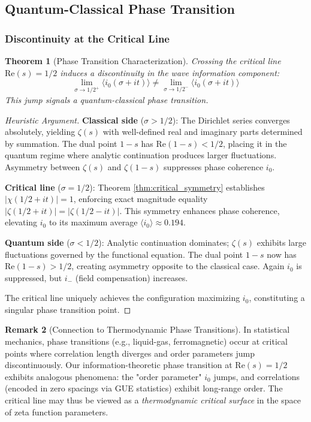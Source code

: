 \documentclass[12pt]{article}
\theoremstyle{plain}
\newtheorem{theorem}{Theorem}[section]
\theoremstyle{definition}
\newtheorem{remark}[theorem]{Remark}
\begin{document}
\subsection{Quantum-Classical Phase Transition}

\subsubsection{Discontinuity at the Critical Line}

\begin{theorem}[Phase Transition Characterization]\label{thm:phase_transition}
Crossing the critical line $\text{Re}(s) = 1/2$ induces a discontinuity in the wave information component:
\begin{equation}
\lim_{\sigma \to 1/2^+} \langle i_0(\sigma + it) \rangle \neq \lim_{\sigma \to 1/2^-} \langle i_0(\sigma + it) \rangle
\end{equation}
This jump signals a quantum-classical phase transition.
\end{theorem}

\begin{proof}[Heuristic Argument]
\textbf{Classical side} ($\sigma > 1/2$): The Dirichlet series converges absolutely, yielding $\zeta(s)$ with well-defined real and imaginary parts determined by summation. The dual point $1-s$ has $\text{Re}(1-s) < 1/2$, placing it in the quantum regime where analytic continuation produces larger fluctuations. Asymmetry between $\zeta(s)$ and $\zeta(1-s)$ suppresses phase coherence $i_0$.

\textbf{Critical line} ($\sigma = 1/2$): Theorem \ref{thm:critical_symmetry} establishes $|\chi(1/2+it)| = 1$, enforcing exact magnitude equality $|\zeta(1/2+it)| = |\zeta(1/2-it)|$. This symmetry enhances phase coherence, elevating $i_0$ to its maximum average $\langle i_0 \rangle \approx 0.194$.

\textbf{Quantum side} ($\sigma < 1/2$): Analytic continuation dominates; $\zeta(s)$ exhibits large fluctuations governed by the functional equation. The dual point $1-s$ now has $\text{Re}(1-s) > 1/2$, creating asymmetry opposite to the classical case. Again $i_0$ is suppressed, but $i_-$ (field compensation) increases.

The critical line uniquely achieves the configuration maximizing $i_0$, constituting a singular phase transition point.
\end{proof}

\begin{remark}[Connection to Thermodynamic Phase Transitions]
In statistical mechanics, phase transitions (e.g., liquid-gas, ferromagnetic) occur at critical points where correlation length diverges and order parameters jump discontinuously. Our information-theoretic phase transition at $\text{Re}(s) = 1/2$ exhibits analogous phenomena: the "order parameter" $i_0$ jumps, and correlations (encoded in zero spacings via GUE statistics) exhibit long-range order. The critical line may thus be viewed as a \emph{thermodynamic critical surface} in the space of zeta function parameters.
\end{remark}
\end{document}
